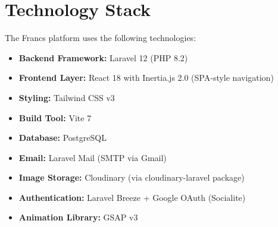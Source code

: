 \section{Technology Stack}
The Francs platform uses the following technologies:
\begin{itemize}
    \item \textbf{Backend Framework:} Laravel 12 (PHP 8.2)
    \item \textbf{Frontend Layer:} React 18 with Inertia.js 2.0 (SPA-style navigation)
    \item \textbf{Styling:} Tailwind CSS v3
    \item \textbf{Build Tool:} Vite 7
    \item \textbf{Database:} PostgreSQL
    \item \textbf{Email:} Laravel Mail (SMTP via Gmail)
    \item \textbf{Image Storage:} Cloudinary (via cloudinary-laravel package)
    \item \textbf{Authentication:} Laravel Breeze + Google OAuth (Socialite)
    \item \textbf{Animation Library:} GSAP v3
\end{itemize}
